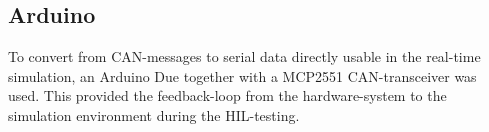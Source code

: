 \documentclass[root.tex]{subfiles}
\begin{document}
\subsection{Arduino}

To convert from \gls{CAN}-messages to serial data directly usable in the real-time simulation, an Arduino Due\cite{due} together with a MCP2551 \gls{CAN}-transceiver was used. This provided the feedback-loop from the hardware-system to the simulation environment during the \gls{HIL}-testing.
\end{document}
